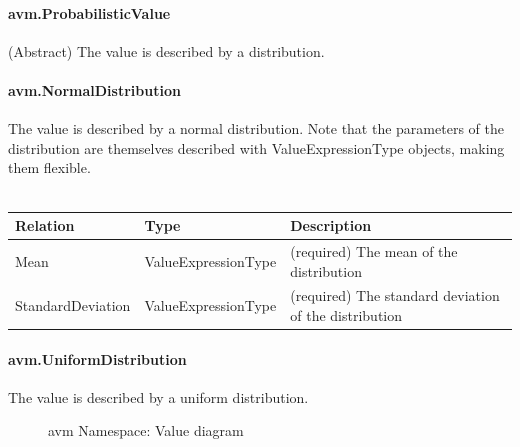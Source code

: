 \paragraph{avm.ProbabilisticValue}
(Abstract) The value is described by a distribution.

\paragraph{avm.NormalDistribution}
The value is described by a normal distribution. Note that the parameters of the distribution are themselves described with ValueExpressionType objects, making them flexible.
\\ \\
\begin{tabular}{ l l p{9cm} }
\textbf{Relation} & \textbf{Type} & \textbf{Description} \\ \hline
Mean & ValueExpressionType & (required) The mean of the distribution \\ \hline
StandardDeviation & ValueExpressionType & (required) The standard deviation of the distribution \\ \hline
\end{tabular}

\paragraph{avm.UniformDistribution}
The value is described by a uniform distribution.

\begin{figure}[h!]
\caption{avm Namespace: Value diagram}
\label{Value_diagram}
\end{figure}


